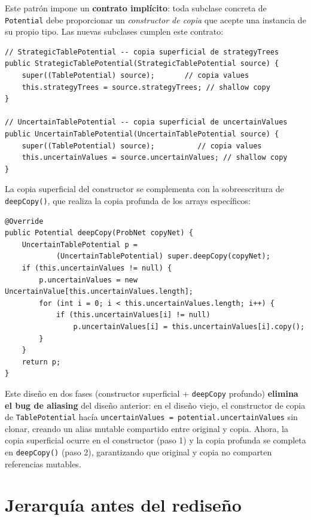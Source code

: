 \documentclass[11pt,a4paper]{article}
\newcommand{\code}[1]{\texttt{#1}}
\begin{document}
Este patrón impone un \textbf{contrato implícito}: toda subclase concreta de
\code{Potential} debe proporcionar un \emph{constructor de copia} que acepte una
instancia de su propio tipo.  Las nuevas subclases cumplen este contrato:

\begin{lstlisting}[caption={Constructores de copia en las nuevas subclases}]
// StrategicTablePotential -- copia superficial de strategyTrees
public StrategicTablePotential(StrategicTablePotential source) {
    super((TablePotential) source);       // copia values
    this.strategyTrees = source.strategyTrees; // shallow copy
}

// UncertainTablePotential -- copia superficial de uncertainValues
public UncertainTablePotential(UncertainTablePotential source) {
    super((TablePotential) source);          // copia values
    this.uncertainValues = source.uncertainValues; // shallow copy
}
\end{lstlisting}

La copia superficial del constructor se complementa con la sobreescritura de
\code{deepCopy()}, que realiza la copia profunda de los arrays específicos:

\begin{lstlisting}[caption={\code{deepCopy()} en \code{UncertainTablePotential}}]
@Override
public Potential deepCopy(ProbNet copyNet) {
    UncertainTablePotential p =
            (UncertainTablePotential) super.deepCopy(copyNet);
    if (this.uncertainValues != null) {
        p.uncertainValues = new UncertainValue[this.uncertainValues.length];
        for (int i = 0; i < this.uncertainValues.length; i++) {
            if (this.uncertainValues[i] != null)
                p.uncertainValues[i] = this.uncertainValues[i].copy();
        }
    }
    return p;
}
\end{lstlisting}

Este diseño en dos fases (constructor superficial + \code{deepCopy} profundo)
\textbf{elimina el bug de aliasing} del diseño anterior: en el diseño viejo, el
constructor de copia de \code{TablePotential} hacía
\code{uncertainValues = potential.uncertainValues} sin clonar, creando un alias
mutable compartido entre original y copia.  Ahora, la copia superficial ocurre en
el constructor (paso 1) y la copia profunda se completa en \code{deepCopy()}
(paso 2), garantizando que original y copia no comparten referencias mutables.

\section{Jerarquía antes del rediseño}
\label{sec:before}
\end{document}
